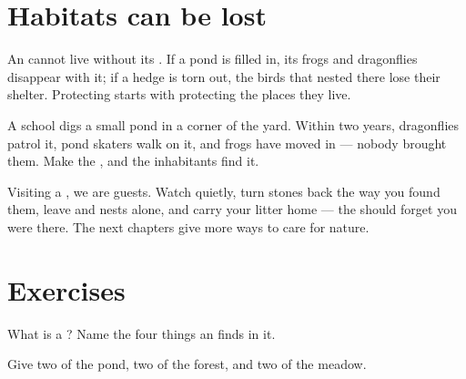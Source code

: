 \section{Habitats can be lost}

\begin{proposition}\label{prop:g2:where-animals-live:loss}
An  cannot live without its . If a pond is filled
in, its frogs and dragonflies disappear with it; if a hedge is
torn out, the birds that nested there lose their shelter.
Protecting  starts with protecting the places they live.
\end{proposition}
\admitted

\begin{example}\label{ex:g2:where-animals-live:schoolpond}
A school digs a small pond in a corner of the yard. Within two
years, dragonflies patrol it, pond skaters walk on it, and frogs
have moved in --- nobody brought them. Make the , and the
inhabitants find it.
\end{example}

\begin{remark}\label{rem:g2:where-animals-live:respect}
Visiting a , we are guests. Watch quietly, turn stones
back the way you found them, leave  and nests alone, and
carry your litter home --- the  should forget you were
there. The next chapters give more ways to care for nature.
\end{remark}

\section{Exercises}

\begin{exercise}[$\star$]\label{exo:g2:where-animals-live:1}
What is a ? Name the four things an  finds in it.
\end{exercise}

\begin{exercise}[$\star$]\label{exo:g2:where-animals-live:2}
Give two  of the pond, two of the forest, and two of the
meadow.
\end{exercise}

